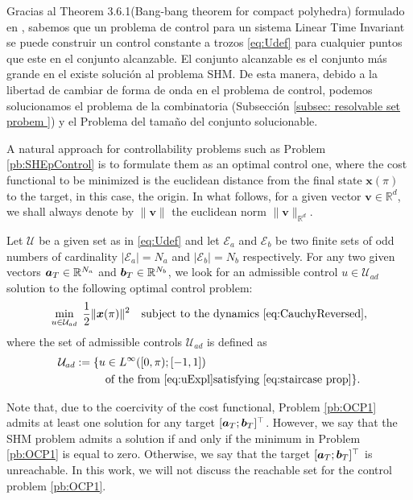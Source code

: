\documentclass[twocolumn]{autart}    %
\begin{document}
\JOStart
Gracias al Theorem 3.6.1(Bang-bang theorem for compact polyhedra) formulado en \cite[Chapter~2.7]{schattler2012geometric}, sabemos que un problema de control para un sistema Linear Time Invariant  se puede construir un control constante a trozos \eqref{eq:Udef} para cualquier puntos que este en el conjunto alcanzable. El conjunto alcanzable es el conjunto más grande en el existe solución al problema SHM. De esta manera, debido a la libertad de cambiar de forma de onda en el problema de control, podemos solucionamos el problema de la combinatoria (Subsección \ref{subsec: resolvable set probem }) y el Problema del tamaño del conjunto solucionable. 
\JOEnd

A natural approach for controllability problems such as Problem \ref{pb:SHEpControl} is to formulate them as an optimal control one, where the cost functional to be minimized is the euclidean distance from the final state $\bm{x}(\pi)$ to the target, in this case, the origin. In what follows, for a given vector $\bm{v}\in\mathbb{R}^d$, we shall always denote by $\|\bm{v}\|$ the euclidean norm $\|\bm{v}\|_{\mathbb{R}^d}$.
\newline

\begin{problem}\label{pb:OCP1}
Let $\mathcal{U}$ be a given set as in \eqref{eq:Udef} and let $\mathcal{E}_a $ and $\mathcal{E} _b $ be two finite sets of odd numbers of cardinality $|\mathcal{E}_a| = N_a $ and $ |\mathcal{E} _b| = N_b$ respectively. For any two given vectors $\bm{a}_T \in \mathbb{R}^{N_a}$ and $\bm{b}_T \in \mathbb{R}^{N_b} $, we look for an admissible control $u\in \mathcal{U}_{ad}$ solution to the following optimal control problem:
\begin{equation*}
	\min_{u \in \mathcal{U}_{ad}}\;\frac 12 \|\bm{x}(\pi)\|^2 \quad \text{subject to the dynamics \eqref{eq:CauchyReversed}},
\end{equation*}
where the set of admissible controls $\mathcal{U}_{ad}$ is defined as
\begin{align*}
	\mathcal{U}_{ad} := \{ u&\in L^\infty ([0,\pi); [-1,1]) 
	\\ 
	&\text{of the from \eqref{eq:uExpl}} \text{satisfying \eqref{eq:staircase prop}} \}.
\end{align*}
\end{problem}


\begin{remark}
Note that, due to the coercivity of the cost functional, Problem \ref{pb:OCP1} admits at least one solution for any target $[\bm{a}_T;\bm{b}_T]^\top$. However, we say that the SHM problem admits a solution if and only if the minimum in Problem \ref{pb:OCP1} is equal to zero. Otherwise, we say that the target $[\bm{a}_T;\bm{b}_T]^\top$ is unreachable. In this work, we will not discuss the reachable set for the control problem \eqref{pb:OCP1}.
\end{remark}
\end{document}
